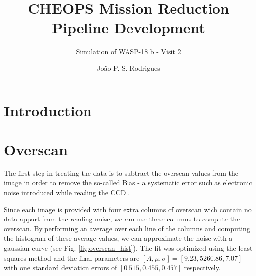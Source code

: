 \documentclass{aa}
\begin{document}
 


   \title{CHEOPS Mission Reduction Pipeline Development}

   \subtitle{Simulation of WASP-18 b - Visit 2}

   \author{João P. S. Rodrigues}


   \date{}

 
  \abstract
   {}
   {}
   {}
   {}
   {}

   \keywords{}

   \maketitle
%

\section{Introduction}

\section{Overscan}

The first step in treating the data is to subtract the overscan values from the image in order to remove the so-called Bias - a systematic error such as electronic noise introduced while reading the CCD .

Since each image is provided with four extra columns of overscan wich contain no data appart from the reading noise, we can use these columns to compute the overscan. By performing an average over each line of the columns and computing the histogram of these average values, we can approximate the noise with a gaussian curve (see Fig. \ref{fig:overscan_hist}). The fit was optimized using the least squares method and the final parameters are $[A, \mu , \sigma] = [9.23, 5260.86, 7.07]$ with one standard deviation errors of $[0.515, 0.455, 0.457]$ respectively.
\end{document}
